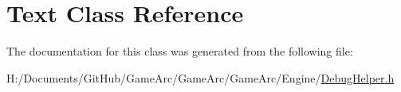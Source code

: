 \hypertarget{class_text}{\section{Text Class Reference}
\label{class_text}
}


The documentation for this class was generated from the following file\+:\begin{DoxyCompactItemize}
\item 
H\+:/\+Documents/\+Git\+Hub/\+Game\+Arc/\+Game\+Arc/\+Game\+Arc/\+Engine/\hyperlink{_debug_helper_8h}{Debug\+Helper.\+h}\end{DoxyCompactItemize}
